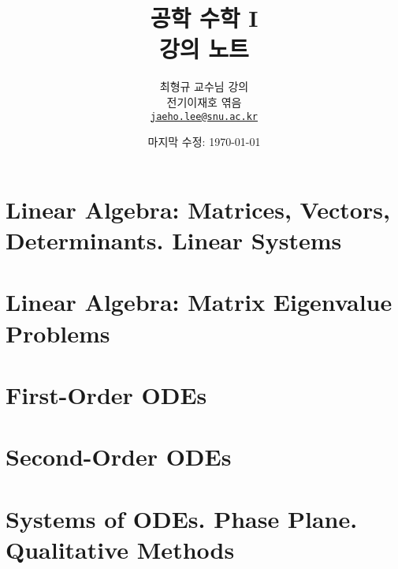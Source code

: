 \documentclass[
    oneside,
    a4paper,
    adjustmath,
    itemph,
    nonfrench,
    11pt,
]{oblivoir}
\title{공학 수학 I\\강의 노트}
\author{최형규 교수님 강의\vspace{0.3cm}\\전기\textperiodcentered정보공학부 이재호 엮음\\\href{mailto:jaeho.lee@snu.ac.kr}{\texttt{jaeho.lee@snu.ac.kr}}}
\date{마지막 수정: \today}
\theoremstyle{definition}
\theoremstyle{plain}
\theoremstyle{plain}
\theoremstyle{remark}
\theoremstyle{remark}
\theoremstyle{remark}
\begin{document}
\maketitle

\setcounter{section}{6}
\reversemarginpar{}
\section{Linear Algebra: Matrices, Vectors, Determinants. Linear Systems}


\section{Linear Algebra: Matrix Eigenvalue Problems}


\setcounter{section}{0}
\section{First-Order ODEs}


\section{Second-Order ODEs}


\setcounter{section}{3}
\section{Systems of ODEs. Phase Plane. Qualitative Methods}

\end{document}
